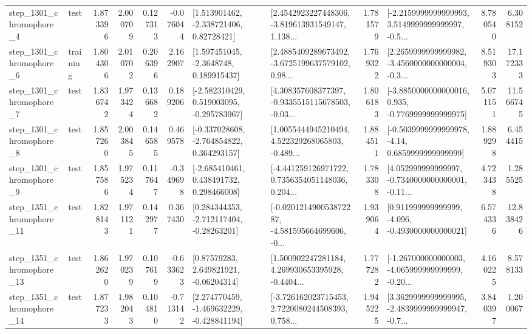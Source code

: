 \begin{tabular}{llrrrrllrlrr}
  step\_1301\_chromophore\_4 &      test &      1.873396 &    2.000709 &      0.127313 & -0.076044 &     [1.513901462, -2.338721406, 0.82728421] &  [2.4542923227448306, -3.819613931549147, 1.138... &       1.781579 &  [-2.2159999999999993, 3.5149999999999997, -0.5... &            8.780540 &          6.308152 \\
  step\_1301\_chromophore\_6 &  training &      1.804306 &    2.010702 &      0.206396 &  2.162907 &      [1.597451045, -2.3648748, 0.189915437] &  [2.4885409289673492, -3.6725199637579102, 0.98... &       1.769322 &  [2.2659999999999982, -3.4560000000000004, -0.3... &            8.519303 &         17.172333 \\
  step\_1301\_chromophore\_7 &      test &      1.836742 &    1.973424 &      0.136682 &  0.189206 &   [-2.582310429, 0.519003095, -0.295783967] &  [4.308357608377397, -0.9335515115678503, -0.03... &       1.806183 &  [-3.8850000000000016, 0.935, -0.7769999999999975] &            5.071151 &         11.566745 \\
  step\_1301\_chromophore\_8 &      test &      1.857260 &    2.003845 &      0.146585 &  0.469578 &   [-0.337028608, -2.764854822, 0.364293157] &  [1.0055444945210494, 4.522329268065803, -0.489... &       1.884511 &   [-0.5039999999999978, -4.14, 0.6859999999999999] &            1.889298 &          6.454415 \\
  step\_1301\_chromophore\_9 &      test &      1.857586 &    1.975234 &      0.117647 & -0.349698 &    [-2.685410461, 0.438491732, 0.298466008] &  [-4.441259126971722, 0.7356354051148036, 0.204... &       1.783308 &  [4.052999999999997, -0.7340000000000001, -0.11... &            4.723438 &          1.285525 \\
 step\_1351\_chromophore\_11 &      test &      1.828143 &    1.971121 &      0.142977 &  0.367430 &    [0.284344353, -2.712117404, -0.28263201] &  [-0.020121490053872287, -4.581595664699606, -0... &       1.939064 &   [0.911999999999999, -4.096, -0.4930000000000021] &            6.574336 &         12.838426 \\
 step\_1351\_chromophore\_13 &      test &      1.862620 &    1.970239 &      0.107619 & -0.633623 &      [0.87579283, 2.649821921, -0.06204314] &  [1.500902247281184, 4.269930653395928, -0.4404... &       1.777282 &  [-1.267000000000003, -4.065999999999999, -0.20... &            4.160225 &          8.578133 \\
 step\_1351\_chromophore\_14 &      test &      1.877233 &    1.982043 &      0.104810 & -0.713142 &   [2.274770459, -1.469632229, -0.428841194] &  [-3.726162023715453, 2.7220080244508393, 0.758... &       1.945225 &  [3.3629999999999995, -2.4839999999999947, -0.7... &            3.840397 &          1.200067 \\

\end{tabular}
